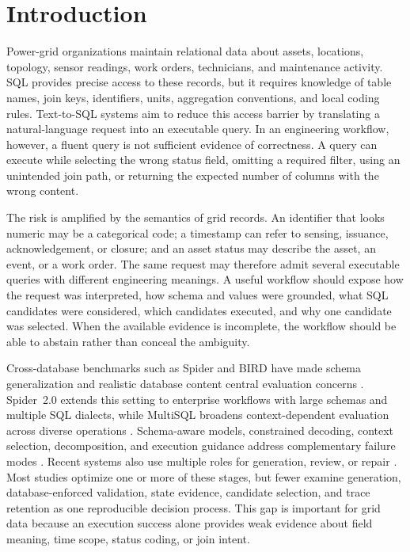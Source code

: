 \documentclass[applsci,article,submit,moreauthors]{Definitions/mdpi}
\begin{document}
\section{Introduction}

Power-grid organizations maintain relational data about assets, locations, topology, sensor readings, work orders, technicians, and maintenance activity. SQL provides precise access to these records, but it requires knowledge of table names, join keys, identifiers, units, aggregation conventions, and local coding rules. Text-to-SQL systems aim to reduce this access barrier by translating a natural-language request into an executable query. In an engineering workflow, however, a fluent query is not sufficient evidence of correctness. A query can execute while selecting the wrong status field, omitting a required filter, using an unintended join path, or returning the expected number of columns with the wrong content.

The risk is amplified by the semantics of grid records. An identifier that looks numeric may be a categorical code; a timestamp can refer to sensing, issuance, acknowledgement, or closure; and an asset status may describe the asset, an event, or a work order. The same request may therefore admit several executable queries with different engineering meanings. A useful workflow should expose how the request was interpreted, how schema and values were grounded, what SQL candidates were considered, which candidates executed, and why one candidate was selected. When the available evidence is incomplete, the workflow should be able to abstain rather than conceal the ambiguity.

Cross-database benchmarks such as Spider and BIRD have made schema generalization and realistic database content central evaluation concerns \cite{yu2018spider,li2023bird}. Spider~2.0 extends this setting to enterprise workflows with large schemas and multiple SQL dialects, while MultiSQL broadens context-dependent evaluation across diverse operations \cite{lei2025spider2,li2024multisql}. Schema-aware models, constrained decoding, context selection, decomposition, and execution guidance address complementary failure modes \cite{wang2020ratsql,scholak2021picard,nan2023enhancing,pourreza2023dinsql,talaei2024chess}. Recent systems also use multiple roles for generation, review, or repair \cite{lee2025team,wang2025macsql,shao2025qcmasql,xia2025r3}. Most studies optimize one or more of these stages, but fewer examine generation, database-enforced validation, state evidence, candidate selection, and trace retention as one reproducible decision process. This gap is important for grid data because an execution success alone provides weak evidence about field meaning, time scope, status coding, or join intent.
\end{document}
